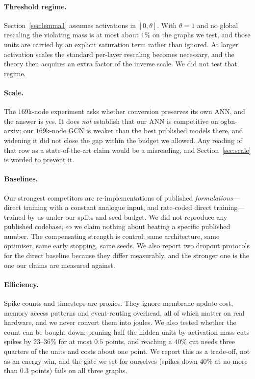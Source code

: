 \documentclass[10pt,twocolumn]{article}
\newcommand{\secref}[1]{Section~\ref{#1}}
\begin{document}
\paragraph{Threshold regime.} \secref{sec:lemma1} assumes activations in $[0,\theta]$. With
$\theta = 1$ and no global rescaling the violating mass is at most about $1\%$ on the graphs we test,
and those units are carried by an explicit saturation term rather than ignored. At larger activation
scales the standard per-layer rescaling becomes necessary, and the theory then acquires an extra
factor of the inverse scale. We did not test that regime.

\paragraph{Scale.} The $169$k-node experiment asks whether conversion preserves its own ANN, and the
answer is yes. It does \emph{not} establish that our ANN is competitive on ogbn-arxiv; our
$169$k-node GCN is weaker than the best published models there, and widening it did not close the gap
within the budget we allowed. Any reading of that row as a state-of-the-art claim would be a
misreading, and \secref{sec:scale} is worded to prevent it.

\paragraph{Baselines.} Our strongest competitors are re-implementations of published
\emph{formulations}---direct training with a constant analogue input, and rate-coded direct
training---trained by us under our splits and seed budget. We did not reproduce any published
codebase, so we claim nothing about beating a specific published number. The compensating strength is
control: same architecture, same optimiser, same early stopping, same seeds. We also report two
dropout protocols for the direct baseline because they differ measurably, and the stronger one is the
one our claims are measured against.

\paragraph{Efficiency.} Spike counts and timesteps are proxies. They ignore membrane-update cost, memory access patterns and event-routing overhead, all of which matter on real hardware, and we never convert them into joules. We also tested whether the count can be bought down: pruning half the hidden units by activation mass cuts spikes by $23$--$36\%$ for at most $0.5$ points, and reaching a $40\%$ cut needs three quarters of the units and costs about one point. We report this as a trade-off, not as an energy win, and the gate we set for ourselves (spikes down $40\%$ at no more than $0.3$ points) fails on all three graphs.
\end{document}
